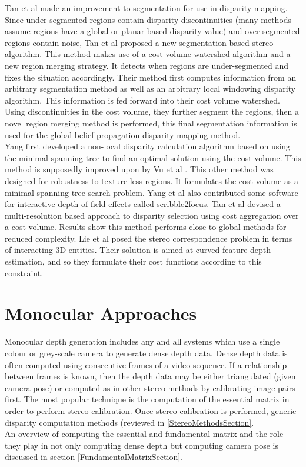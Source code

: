 Tan et al \cite{Tan14Stereo} made an improvement to segmentation for use in disparity mapping. Since under-segmented regions contain disparity discontinuities (many methods assume regions have a global or planar based disparity value) and over-segmented regions contain noise, Tan et al proposed a new segmentation based stereo algorithm. This method makes use of a cost volume watershed algorithm and a new region merging strategy. It detects when regions are under-segmented and fixes the situation accordingly. Their method first computes information from an arbitrary segmentation method as well as an arbitrary local windowing disparity algorithm. This information is fed forward into their cost volume watershed. Using discontinuities in the cost volume, they further segment the regions, then a novel region merging method is performed, this final segmentation information is used for the global belief propagation disparity mapping method. \\


Yang \cite{Yang14Pattern} first developed a non-local disparity calculation algorithm based on using the minimal spanning tree to find an optimal solution using the cost volume. This method is supposedly improved upon by Vu et al \cite{Vu14Efficient}. This other method was designed for robustness to texture-less regions. It formulates the cost volume as a minimal spanning tree search problem. Yang et al also contributed some software for interactive depth of field effects called scribble2focus. Tan et al \cite{Tan14Soft} devised a multi-resolution based approach to disparity selection using cost aggregation over a cost volume. Results show this method performs close to global methods for reduced complexity. Lie et al \cite{Liu143d} posed the stereo correspondence problem in terms of interacting 3D entities. Their solution is aimed at curved feature depth estimation, and so they formulate their cost functions according to this constraint. \\



\section{Monocular Approaches}

Monocular depth generation includes any and all systems which use a single colour or grey-scale camera to generate dense depth data. Dense depth data is often computed using consecutive frames of a video sequence. If a relationship between frames is known, then the depth data may be either triangulated (given camera pose) or computed as in other stereo methods by calibrating image pairs first. The most popular technique is the computation of the essential matrix in order to perform stereo calibration. Once stereo calibration is performed, generic disparity computation methods (reviewed in \ref{StereoMethodsSection}. \\

An overview of computing the essential and fundamental matrix and the role they play in not only computing dense depth but computing camera pose is discussed in section \ref{FundamentalMatrixSection}. 

